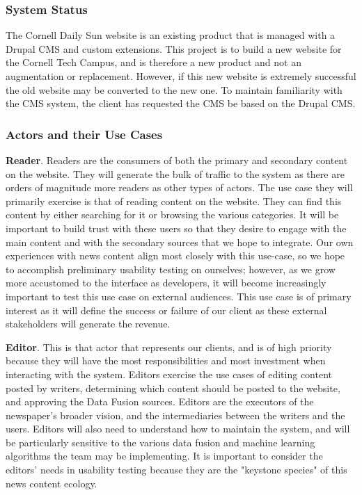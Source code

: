 \documentclass[10pt]{article} %
\begin{document}
\subsubsection{System Status}
                   
The Cornell Daily Sun website is an existing product that is managed with a Drupal CMS and custom extensions. This project is to build a new website for the Cornell Tech Campus, and is therefore a new product and not an augmentation or replacement. However, if this new website is extremely successful the old website may be converted to the new one. To maintain familiarity with the CMS system, the client has requested the CMS be based on the Drupal CMS.

\subsubsection{Actors and their Use Cases}

\textbf{Reader}. Readers are the consumers of both the primary and secondary content on the website. They will generate the bulk of traffic to the system as there are orders of magnitude more readers as other types of actors. The use case they will primarily exercise is that of reading content on the website. They can find this content by either searching for it or browsing the various categories. It will be important to build trust with these users so that they desire to engage with the main content and with the secondary sources that we hope to integrate. Our own experiences with news content align most closely with this use-case, so we hope to accomplish preliminary usability testing on ourselves; however, as we grow more accustomed to the interface as developers, it will become increasingly important to test this use case on external audiences. This use case is of primary interest as it will define the success or failure of our client as these external stakeholders will generate the revenue.

\textbf{Editor}. This is that actor that represents our clients, and is of high priority because they will have the most responsibilities and most investment when interacting with the system. Editors exercise the use cases of editing content posted by writers, determining which content should be posted to the website, and approving the Data Fusion sources. Editors are the executors of the newspaper’s broader vision, and the intermediaries between the writers and the users. Editors will also need to understand how to maintain the system, and will be particularly sensitive to the various data fusion and machine learning algorithms the team may be implementing. It is important to consider the editors' needs in usability testing because they are the "keystone species" of this news content ecology.
\end{document}
